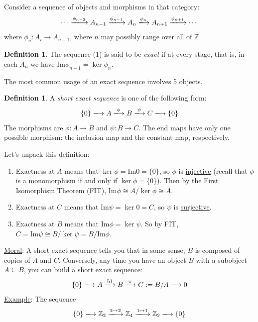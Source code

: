 \documentclass[12pt]{article}
\newcommand{\z}{\mathbb{Z}}
\newcommand{\ita}[1]{\textit{#1}}
\theoremstyle{definition}
\newtheorem{definition}[theorem]{Definition}
\begin{document}
Consider a sequence of objects and morphisms in that category:
\begin{equation}
    \dotsb \xlongrightarrow{\phi_{n-2}}A_{n-1}\xlongrightarrow{\phi_{n-1}}A_n\xlongrightarrow{\phi_n} A_{n+1}\xlongrightarrow{\phi_{n+1}}\dotsb
\end{equation}
where $\phi_n:A_i\to A_{n+1}$, where $n$ may possibly range over all of $\z$. 
\begin{definition}
The sequence (1) is said to be \ita{exact} if at every stage, that is, in each $A_n$ we have Im$\phi_{n-1}=\ker\phi_n$.
\end{definition}
The most common usage of an exact sequence involves 5 objects.
\begin{definition}
A \ita{short exact sequence} is one of the following form:
\begin{equation}
    \{0\}\xlongrightarrow{} A\xlongrightarrow{\phi}B\xlongrightarrow{\psi}C\xlongrightarrow{}\{0\}
\end{equation}
The morphisms are $\phi:A\to B$ and $\psi:B\to C$. The end maps have only one possible morphism: the inclusion map and the constant map, respectively.
\end{definition}
Let's unpack this definition:
\begin{enumerate}
    \item Exactness at $A$ means that $\ker\phi=\text{Im}0=\{0\}$, so $\phi$ is \underline{injective} (recall that $\phi$ is a monomorphism if and only if $\ker\phi=\{0\}$). Then by the First Isomorphism Theorem (FIT), $\text{Im}\phi\cong A/\ker\phi\cong A$.
    \item Exactness at $C$ means that Im$\psi=\ker0=C$, so $\psi$ is \underline{surjective}.
    \item Exactness at $B$ means that Im$\phi=\ker\psi$. So by FIT, $C=\text{Im}\psi\cong B/\ker\psi=B/\text{Im}\phi$.
\end{enumerate}
\underline{Moral}: A short exact sequence tells you that in some sense, $B$ is composed of copies of $A$ and $C$. Conversely, any time you have an object $B$ with a subobject $A\subseteq B$, you can build a short exact sequence:
\begin{equation}
    \{0\}\xlongrightarrow{}A\xlongrightarrow{\text{Id}}B\xlongrightarrow{\pi}C:=B/A\xlongrightarrow{}{0}
\end{equation}
\underline{Example}: The sequence
\begin{equation}
    \{0\}\xlongrightarrow{}\z_2\xlongrightarrow{1\mapsto2}\z_4\xlongrightarrow{1\mapsto1}\z_2\xlongrightarrow{}\{0\}
\end{equation}
\end{document}
